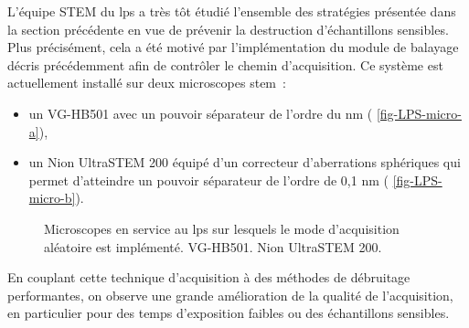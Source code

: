     L'équipe STEM du \gls{lps} a très tôt étudié l'ensemble des stratégies présentée dans la section précédente en vue de prévenir la destruction d'échantillons sensibles. Plus précisément, cela a été motivé par l'implémentation du module de balayage décris précédemment afin de contrôler le chemin d'acquisition. Ce système est actuellement installé sur deux microscopes \gls{stem} :
    \begin{itemize}
        \item un VG-HB501 avec un pouvoir séparateur de l’ordre du nm (\cf{} \cref{fig-LPS-micro-a}),
        \item un Nion UltraSTEM 200 équipé d’un correcteur d’aberrations sphériques qui permet d’atteindre un pouvoir séparateur de l’ordre de 0,1 nm (\cf{} \cref{fig-LPS-micro-b}).
    \end{itemize}
    \begin{figure}
        \centering  %
        \hspace{1em}
        \caption{Microscopes en service au \gls{lps} sur lesquels le mode d'acquisition aléatoire est implémenté.  VG-HB501.  Nion UltraSTEM 200.
            \protect\label{fig-LPS-micro}}
    \end{figure}
    En couplant cette technique d'acquisition à des méthodes de débruitage performantes, on observe une grande amélioration de la qualité de l'acquisition, en particulier pour des temps d'exposition faibles ou des échantillons sensibles. 
    

